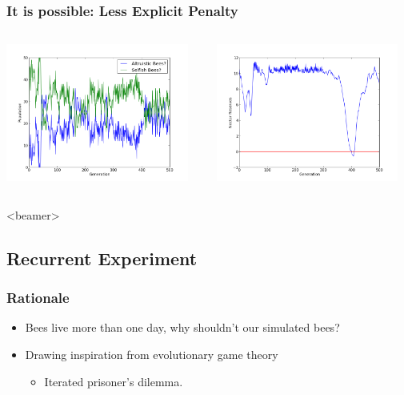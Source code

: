 \documentclass{beamer}
\begin{document}
      \begin{frame}[c]\frametitle{It is possible: Less Explicit Penalty}
        \begin{columns}
        \begin{column}{0.48\textwidth}
          \includegraphics[width=6cm]{results/selfish_modify.png}
        \end{column}
        \begin{column}{0.48\textwidth}
          \includegraphics[width=6cm]{results/selfish_modify_nectar.png}
        \end{column}
        \end{columns}
      \end{frame}

    \setcounter{tocdepth}{2}
      \begin{frame}<beamer>
      \end{frame}
    \setcounter{tocdepth}{3}
 
    \subsection{Recurrent Experiment} %
    \label{sub:recurrent_experiment}
    
      \begin{frame}[c]\frametitle{Rationale}
        \begin{itemize}
          \item Bees live more than one day, why shouldn't our simulated bees?
          \item Drawing inspiration from evolutionary game theory
          \begin{itemize}
            \item Iterated prisoner's dilemma.
          \end{itemize}
        \end{itemize}
      \end{frame}
\end{document}
